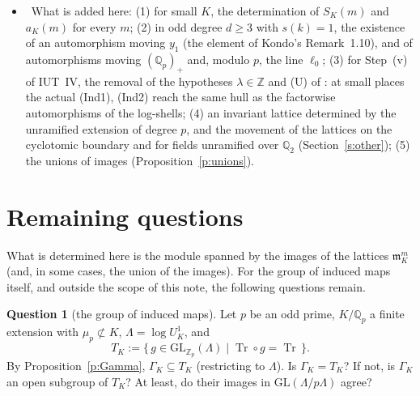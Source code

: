 \documentclass[11pt,a4paper]{article}
\newcommand{\Z}{\mathbb{Z}}
\newcommand{\Zp}{\mathbb{Z}_p}
\newcommand{\Qp}{\mathbb{Q}_p}
\newcommand{\fm}{\mathfrak{m}}
\newcommand{\Tr}{\operatorname{Tr}}
\newcommand{\GL}{\mathrm{GL}}
\newcommand{\lab}[2]{{\upshape\fcolorbox{#1}{#1!8}{\scriptsize\sffamily\bfseries\textcolor{#1}{#2}}}}
\newcommand{\tagP}{\lab{ForestGreen}{P}}
\theoremstyle{plain}
\theoremstyle{definition}
\newtheorem{question}[theorem]{Question}
\theoremstyle{remark}
\begin{document}
\begin{itemize}
rings of integers \cite{Zeng}. Joshi reads (Ind1) as anabelomorphy \cite[\S8.11.2]{JoshiIII}, a reading different from
the one used here.
\item \tagP\ What is added here: (1) for small $K$, the determination of $S_K(m)$ and $a_K(m)$ for every $m$; (2) in
odd degree $d\ge3$ with $s(k)=1$, the existence of an automorphism moving $y_1$ (the element of Kondo's Remark~1.10),
and of automorphisms moving $(\Qp)_+$ and, modulo $p$, the line $\ell_0$; (3) for Step~(v) of IUT~IV, the removal of
the hypotheses $\lambda\in\Z$ and (U) of \cite{Tiers}: at small places the actual (Ind1), (Ind2) reach the same hull as
the factorwise automorphisms of the log-shells; (4) an invariant lattice determined by the unramified extension of
degree $p$, and the movement of the lattices on the cyclotomic boundary and for fields unramified over $\mathbb Q_2$
(Section~\ref{s:other}); (5) the unions of images (Proposition~\ref{p:unions}).
\end{itemize}

\section{Remaining questions}\label{s:questions}
What is determined here is the module spanned by the images of the lattices $\fm_K^m$ (and, in some cases, the union
of the images). For the group of induced maps itself, and outside the scope of this note, the following questions
remain.

\begin{question}[the group of induced maps]\label{q:group}
Let $p$ be an odd prime, $K/\Qp$ a finite extension with $\mu_p\not\subset K$, $\Lambda=\log U^1_K$, and
\[
T_K:=\{\,g\in\GL_{\Zp}(\Lambda)\mid\Tr\circ g=\Tr\,\}.
\]
By Proposition~\ref{p:Gamma}, $\Gamma_K\subseteq T_K$ (restricting to $\Lambda$). Is $\Gamma_K=T_K$? If not, is
$\Gamma_K$ an open subgroup of $T_K$? At least, do their images in $\GL(\Lambda/p\Lambda)$ agree?
\end{question}
\end{document}
